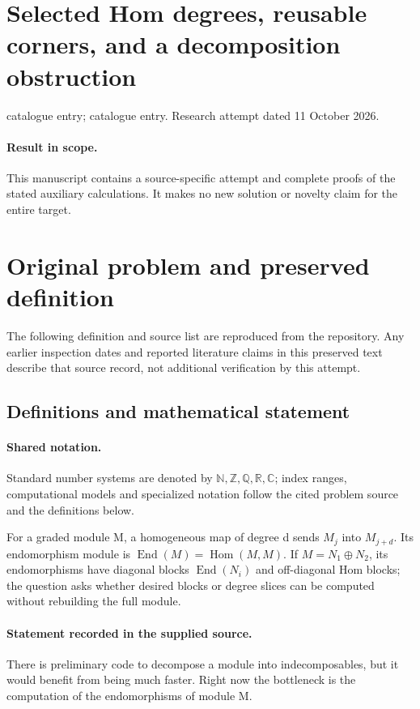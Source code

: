 \documentclass[11pt]{article}
\begin{document}
\section*{Selected Hom degrees, reusable corners, and a decomposition obstruction}
\noindent catalogue entry; catalogue entry. Research attempt dated 11 October 2026.
\paragraph{Result in scope.}This manuscript contains a source-specific attempt and complete proofs of the stated auxiliary calculations. It makes no new solution or novelty claim for the entire target.
\section{Original problem and preserved definition}
The following definition and source list are reproduced from the repository. Any earlier inspection dates and reported literature claims in this preserved text describe that source record, not additional verification by this attempt.
\subsection{Definitions and mathematical statement}

\paragraph{Shared notation.}Standard number systems are denoted by $\mathbb N,\mathbb Z,\mathbb Q,\mathbb R,\mathbb C$; index ranges, computational models and specialized notation follow the cited problem source and the definitions below.


For a graded module M, a homogeneous map of degree d sends $M_j$ into $M_{j+d}$. Its endomorphism module is $\operatorname{End}(M)=\operatorname{Hom}(M,M)$. If $M=N_1\oplus N_2$, its endomorphisms have diagonal blocks $\operatorname{End}(N_i)$ and off-diagonal Hom blocks; the question asks whether desired blocks or degree slices can be computed without rebuilding the full module.
\paragraph{Statement recorded in the supplied source.}
There is preliminary code to decompose a module into indecomposables, but it would benefit from being much faster. Right now the bottleneck is the computation of the endomorphisms of module M.
\end{document}
